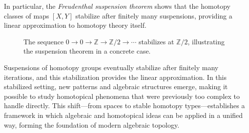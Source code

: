 \documentclass[11pt]{article}
\begin{document}
In particular, the {\it Freudenthal suspension theorem} shows that the homotopy classes of maps $[X,Y]$ stabilize after finitely many suspensions, providing a linear approximation to homotopy theory itself.
\begin{figure}[h]
\centering
{}
\captionsetup{font=footnotesize}
\caption{
The sequence $0 \to 0 \to \mathbb{Z} \to \mathbb{Z}/2 \to \cdots$ stabilizes at $\mathbb{Z}/2$, illustrating the suspension theorem in a concrete case.
}
\end{figure}

Suspensions of homotopy groups eventually stabilize after finitely many iterations, and this stabilization provides the linear approximation.
In this stabilized setting, new patterns and algebraic structures emerge, making it possible to study homotopical phenomena that were previously too complex to handle directly.
This shift—from spaces to stable homotopy types—establishes a framework in which algebraic and homotopical ideas can be applied in a unified way, forming the foundation of modern algebraic topology.
\end{document}
